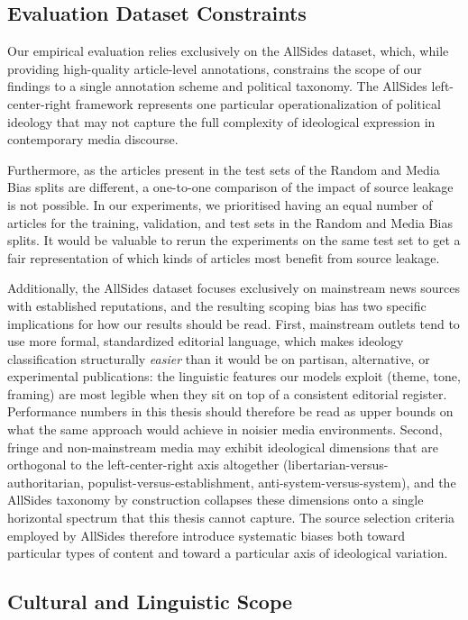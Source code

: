 \subsection{Evaluation Dataset Constraints}

Our empirical evaluation relies exclusively on the AllSides dataset, which, while providing high-quality article-level annotations, constrains the scope of our findings to a single annotation scheme and political taxonomy. The AllSides left-center-right framework represents one particular operationalization of political ideology that may not capture the full complexity of ideological expression in contemporary media discourse.

Furthermore, as the articles present in the test sets of the Random and Media Bias splits are different, a one-to-one comparison of the impact of source leakage is not possible. In our experiments, we prioritised having an equal number of articles for the training, validation, and test sets in the Random and Media Bias splits. It would be valuable to rerun the experiments on the same test set to get a fair representation of which kinds of articles most benefit from source leakage.

Additionally, the AllSides dataset focuses exclusively on mainstream news sources with established reputations, and the resulting scoping bias has two specific implications for how our results should be read. First, mainstream outlets tend to use more formal, standardized editorial language, which makes ideology classification structurally \emph{easier} than it would be on partisan, alternative, or experimental publications: the linguistic features our models exploit (theme, tone, framing) are most legible when they sit on top of a consistent editorial register. Performance numbers in this thesis should therefore be read as upper bounds on what the same approach would achieve in noisier media environments. Second, fringe and non-mainstream media may exhibit ideological dimensions that are orthogonal to the left-center-right axis altogether (libertarian-versus-authoritarian, populist-versus-establishment, anti-system-versus-system), and the AllSides taxonomy by construction collapses these dimensions onto a single horizontal spectrum that this thesis cannot capture. The source selection criteria employed by AllSides therefore introduce systematic biases both toward particular types of content and toward a particular axis of ideological variation.

\subsection{Cultural and Linguistic Scope}

